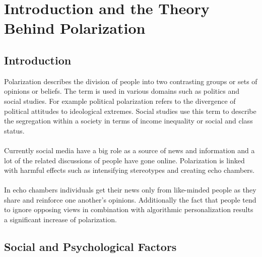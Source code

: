 \chapter{Introduction and the Theory Behind Polarization}
\label{ch:Introduction}


\section{Introduction}
\label{sec:Objectives}

Polarization describes the division of people into two contrasting groups or sets of opinions or beliefs. The term is used in various domains such as politics and social studies. For example political polarization refers to the divergence of political attitudes to ideological extremes. Social studies use this term to  describe the segregation within a society in terms of income inequality or social and class status.
\\
\\
Currently social media have a big role as a source of news and information and a lot of the related discussions of people have gone online. Polarization is linked with harmful effects such as intensifying stereotypes and creating echo chambers. 
\\
\\
In echo chambers individuals get their news only from like-minded people as they share and reinforce one another’s opinions. Additionally the fact that people tend to ignore opposing views in combination with algorithmic personalization results a significant increase of polarization.

\section{Social and Psychological Factors}

